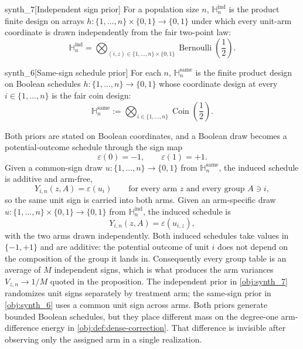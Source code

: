 \begin{definitionv}{synth_7}[Independent sign prior]
For a population size \(n\), \(\mathbb H_n^{\mathrm{ind}}\) is the product finite design on arrays \(h:\{1,\ldots,n\}\times\{0,1\}\to\{0,1\}\) under which every unit-arm coordinate is drawn independently from the fair two-point law:
\[
\mathbb H_n^{\mathrm{ind}}
=
\bigotimes_{(i,z)\in \{1,\ldots,n\}\times\{0,1\}}
\operatorname{Bernoulli}\!\left(\frac12\right).
\]
\end{definitionv}

\begin{definitionv}{synth_6}[Same-sign schedule prior]
For each \(n\), \(\mathbb H_n^{\mathrm{same}}\) is the finite product design on Boolean schedules \(h:\{1,\ldots,n\}\to\{0,1\}\) whose coordinate design at every \(i\in\{1,\ldots,n\}\) is the fair coin design:
\[
\mathbb H_n^{\mathrm{same}}
:=
\bigotimes_{i\in\{1,\ldots,n\}}
\operatorname{Coin}\!\left(\frac12\right).
\]
\end{definitionv}

Both priors are stated on Boolean coordinates, and a Boolean draw becomes a potential-outcome schedule through the sign map
\[
\varepsilon(0)=-1,\qquad \varepsilon(1)=+1 .
\]
Given a common-sign draw \(u:\{1,\ldots,n\}\to\{0,1\}\) from \(\mathbb H_n^{\mathrm{same}}\), the induced schedule is additive and arm-free,
\[
Y_{i,n}(z,A)=\varepsilon(u_i)\qquad\text{for every arm }z\text{ and every group }A\ni i,
\]
so the same unit sign is carried into both arms. Given an arm-specific draw \(u:\{1,\ldots,n\}\times\{0,1\}\to\{0,1\}\) from \(\mathbb H_n^{\mathrm{ind}}\), the induced schedule is
\[
Y_{i,n}(z,A)=\varepsilon(u_{i,z}),
\]
with the two arms drawn independently. Both induced schedules take values in \(\{-1,+1\}\) and are additive: the potential outcome of unit \(i\) does not depend on the composition of the group it lands in. Consequently every group table is an average of \(M\) independent signs, which is what produces the arm variances \(V_{z,n}\to1/M\) quoted in the proposition. The independent prior in \cref{obj:synth_7} randomizes unit signs separately by treatment arm; the same-sign prior in \cref{obj:synth_6} uses a common unit sign across arms. Both priors generate bounded Boolean schedules, but they place different mass on the degree-one arm-difference energy in \cref{obj:def:dense-correction}. That difference is invisible after observing only the assigned arm in a single realization.

